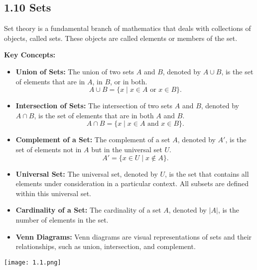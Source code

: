 
\subsection*{1.10 Sets}
Set theory is a fundamental branch of mathematics that deals with collections of objects, called sets. These objects are called elements or members of the set. 

\textbf{Key Concepts:}
\begin{itemize}
    \item \textbf{Union of Sets:} The union of two sets $A$ and $B$, denoted by $A \cup B$, is the set of elements that are in $A$, in $B$, or in both.
    \[
    A \cup B = \{x \mid x \in A \text{ or } x \in B\}.
    \]

    \item \textbf{Intersection of Sets:} The intersection of two sets $A$ and $B$, denoted by $A \cap B$, is the set of elements that are in both $A$ and $B$.
    \[
    A \cap B = \{x \mid x \in A \text{ and } x \in B\}.
    \]

    \item \textbf{Complement of a Set:} The complement of a set $A$, denoted by $A'$, is the set of elements not in $A$ but in the universal set $U$.
    \[
    A' = \{x \in U \mid x \notin A\}.
    \]
    \item \textbf{Universal Set:} The universal set, denoted by $U$, is the set that contains all elements under consideration in a particular context. All subsets are defined within this universal set.

    \item \textbf{Cardinality of a Set:} The cardinality of a set $A$, denoted by $|A|$, is the number of elements in the set.

    \item \textbf{Venn Diagrams:} Venn diagrams are visual representations of sets and their relationships, such as union, intersection, and complement.


\end{itemize}

\begin{center}
    \texttt{[image: 1.1.png]}
\end{center}



